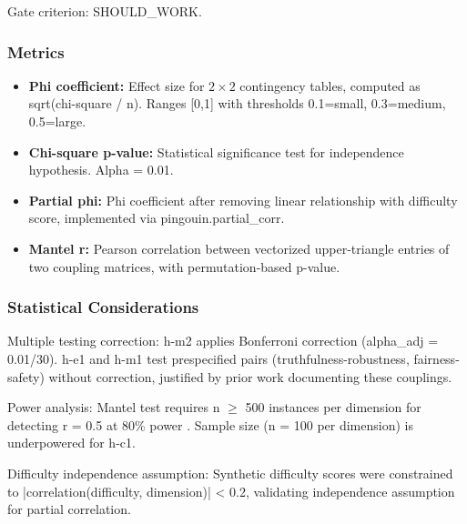 Gate criterion: SHOULD\_WORK.

\subsubsection{Metrics}

\begin{itemize}
\item \textbf{Phi coefficient:} Effect size for $2\times 2$ contingency tables, computed as sqrt(chi-square / n). Ranges [0,1] with thresholds 0.1=small, 0.3=medium, 0.5=large.
\item \textbf{Chi-square p-value:} Statistical significance test for independence hypothesis. Alpha = 0.01.
\item \textbf{Partial phi:} Phi coefficient after removing linear relationship with difficulty score, implemented via pingouin.partial\_corr.
\item \textbf{Mantel r:} Pearson correlation between vectorized upper-triangle entries of two coupling matrices, with permutation-based p-value.
\end{itemize}

\subsubsection{Statistical Considerations}

Multiple testing correction: h-m2 applies Bonferroni correction (alpha\_adj = 0.01/30). h-e1 and h-m1 test prespecified pairs (truthfulness-robustness, fairness-safety) without correction, justified by prior work documenting these couplings.

Power analysis: Mantel test requires n $\geq$ 500 instances per dimension for detecting r = 0.5 at 80\% power \citep{Legendre2010}. Sample size (n = 100 per dimension) is underpowered for h-c1.

Difficulty independence assumption: Synthetic difficulty scores were constrained to |correlation(difficulty, dimension)| < 0.2, validating independence assumption for partial correlation.
